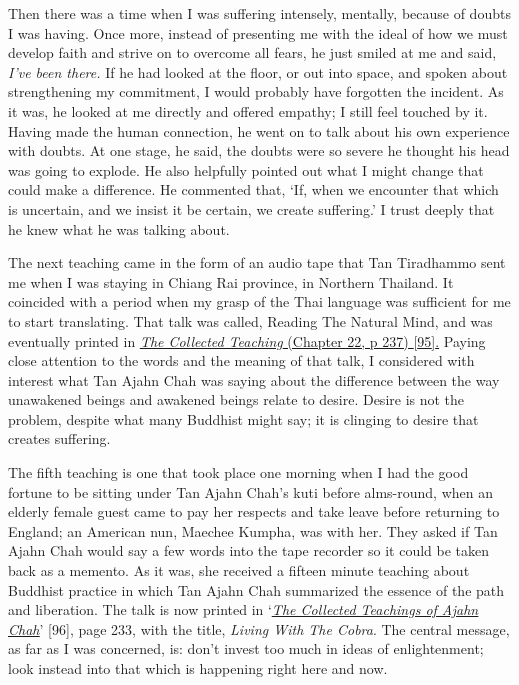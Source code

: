 Then there was a time when I was suffering intensely, mentally, because
of doubts I was having. Once more, instead of presenting me with the
ideal of how we must develop faith and strive on to overcome all fears,
he just smiled at me and said, \emph{I've been there.} If he had looked
at the floor, or out into space, and spoken about strengthening my
commitment, I would probably have forgotten the incident. As it was, he
looked at me directly and offered empathy; I still feel touched by it.
Having made the human connection, he went on to talk about his own
experience with doubts. At one stage, he said, the doubts were so severe
he thought his head was going to explode. He also helpfully pointed out
what I might change that could make a difference. He commented that,
`If, when we encounter that which is uncertain, and we insist it be
certain, we create suffering.' I trust deeply that he knew what he was
talking about.

The next teaching came in the form of an audio tape that Tan Tiradhammo
sent me when I was staying in Chiang Rai province, in Northern Thailand.
It coincided with a period when my grasp of the Thai language was
sufficient for me to start translating. That talk was called, Reading
The Natural Mind, and was eventually printed in
\href{https://forestsangha.org/teachings/books/the-collected-teachings-of-ajahn-chah-single-volume?language=English}{\emph{\underline{The
Collected Teaching}} (Chapter 22, p 237) {[}95{]}.} Paying close
attention to the words and the meaning of that talk, I considered with
interest what Tan Ajahn Chah was saying about the difference between the
way unawakened beings and awakened beings relate to desire. Desire is
not the problem, despite what many Buddhist might say; it is clinging to
desire that creates suffering.

The fifth teaching is one that took place one morning when I had the
good fortune to be sitting under Tan Ajahn Chah's kuti before
alms-round, when an elderly female guest came to pay her respects and
take leave before returning to England; an American nun, Maechee Kumpha,
was with her. They asked if Tan Ajahn Chah would say a few words into
the tape recorder so it could be taken back as a memento. As it was, she
received a fifteen minute teaching about Buddhist practice in which Tan
Ajahn Chah summarized the essence of the path and liberation. The talk
is now printed in
`\href{https://forestsangha.org/teachings/books/the-collected-teachings-of-ajahn-chah-single-volume?language=English}{\emph{\underline{The
Collected Teachings of Ajahn Chah}}}' {[}96{]}, page 233, with the
title, \emph{Living With The Cobra}. The central message, as far as I
was concerned, is: don't invest too much in ideas of enlightenment; look
instead into that which is happening right here and now.

